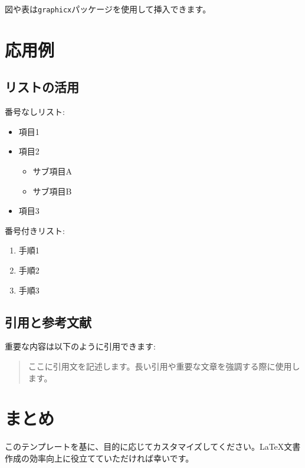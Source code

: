 \documentclass[dvipdfmx,uplatex,a4paper,10pt]{jsarticle}
\begin{document}
図や表は\texttt{graphicx}パッケージを使用して挿入できます。


\section{応用例}

\subsection{リストの活用}

番号なしリスト:
\begin{itemize}
\item 項目1
\item 項目2
  \begin{itemize}
  \item サブ項目A
  \item サブ項目B
  \end{itemize}
\item 項目3
\end{itemize}

番号付きリスト:
\begin{enumerate}
\item 手順1
\item 手順2
\item 手順3
\end{enumerate}

\subsection{引用と参考文献}

重要な内容は以下のように引用できます:

\begin{quote}
ここに引用文を記述します。長い引用や重要な文章を強調する際に使用します。
\end{quote}

\section{まとめ}

このテンプレートを基に、目的に応じてカスタマイズしてください。LaTeX文書作成の効率向上に役立てていただければ幸いです。
\end{document}
